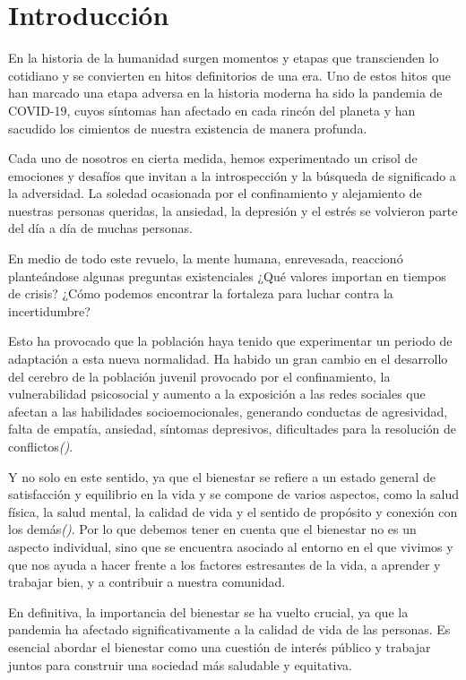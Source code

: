 \chapter{Introducción}

En la historia de la humanidad surgen momentos y etapas que transcienden lo cotidiano y se convierten en hitos definitorios de una era. Uno de estos hitos que han marcado una etapa adversa en la historia moderna ha sido la pandemia de COVID-19, cuyos síntomas han afectado en cada rincón del planeta y han sacudido los cimientos de nuestra existencia de manera profunda. 

Cada uno de nosotros en cierta medida, hemos experimentado un crisol de emociones y desafíos que invitan a la introspección y la búsqueda de significado a la adversidad. La soledad ocasionada por el confinamiento y alejamiento de nuestras personas queridas, la ansiedad, la depresión y el estrés se volvieron parte del día a día de muchas personas.

En medio de todo este revuelo, la mente humana, enrevesada, reaccionó planteándose algunas preguntas existenciales ¿Qué valores importan en tiempos de crisis? ¿Cómo podemos encontrar la fortaleza para luchar contra la incertidumbre? 

Esto ha provocado que la población haya tenido que experimentar un periodo de adaptación a esta nueva normalidad. Ha habido un gran cambio en el desarrollo del cerebro de la población juvenil provocado por el confinamiento, la vulnerabilidad psicosocial y aumento a la exposición a las redes sociales que afectan a las habilidades socioemocionales, generando conductas de agresividad, falta de empatía, ansiedad, síntomas depresivos, dificultades para la resolución de conflictos\textit{(\cite{psychiatry2020})}. 

Y no solo en este sentido, ya que el bienestar se refiere a un estado general de satisfacción y equilibrio en la vida y se compone de varios aspectos, como la salud física, la salud mental, la calidad de vida y el sentido de propósito y conexión con los demás\textit{(\cite{bienestar})}. Por lo que debemos tener en cuenta que el bienestar no es un aspecto individual, sino que se encuentra asociado al entorno en el que vivimos y que nos ayuda a hacer frente a los factores estresantes de la vida, a aprender y trabajar bien, y a contribuir a nuestra comunidad. \vspace{0.3cm}

En definitiva, la importancia del bienestar se ha vuelto crucial, ya que la pandemia ha afectado significativamente a la calidad de vida de las personas. Es esencial abordar el bienestar como una cuestión de interés público y trabajar juntos para construir una sociedad más saludable y equitativa. \\[3cm]

